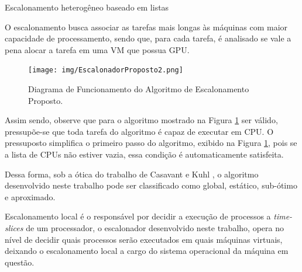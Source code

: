 \begin{algorithm}
\caption{Escalonamento heterogêneo baseado em listas}
\begin{algorithmic}
			\Else
			\EndIf
		\Else
		\EndIf
	\EndWhile
\EndProcedure
\end{algorithmic}
\end{algorithm}

O escalonamento busca associar as tarefas mais longas às máquinas com maior capacidade de processamento, sendo que, para cada tarefa, é analisado se vale a pena alocar a tarefa em uma \acrshort{VM} que possua \acrshort{GPU}.


\begin{figure}[htbp]
	\centerline{\texttt{[image: img/EscalonadorProposto2.png]}}
	\caption{Diagrama de Funcionamento do Algoritmo de Escalonamento Proposto.}
	\label{Escalonamento}
\end{figure}


Assim sendo, observe que para o algoritmo mostrado na Figura \ref{Escalonamento} ser válido, pressupõe-se que toda tarefa do algoritmo é capaz de executar em \acrshort{CPU}. O pressuposto simplifica o primeiro passo do algoritmo, exibido na Figura \ref{Escalonamento}, pois se a lista de \acrshort{CPU}s não estiver vazia, essa condição é automaticamente satisfeita.

Dessa forma, sob a ótica do trabalho de Casavant e Kuhl \cite{4634_TaxonomiaEscalonador}, o algoritmo desenvolvido neste trabalho pode ser classificado como global, estático, sub-ótimo e aproximado.%

Escalonamento local é o responsável por decidir a execução de processos a \textit{time-slices} de um processador, o escalonador desenvolvido neste trabalho, opera no nível de decidir quais processos serão executados em quais máquinas virtuais, deixando o escalonamento local a cargo do sistema operacional da máquina em questão.

